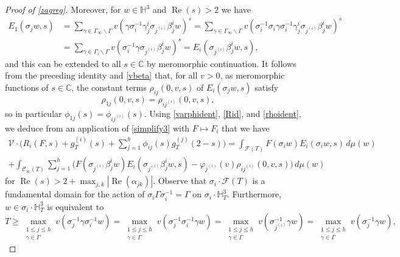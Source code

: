 \documentclass[12pt,reqno]{amsart}
\numberwithin{equation}{section}
\renewcommand{\Re}{\operatorname{Re}}
\begin{document}
\begin{proof}[Proof of \cref{zagreg}]
Moreover, for $w \in \mathbb{H}^3$ and $\Re(s)>2$ we have
\begin{align} \label{eisensteinid}
    E_{1}(\sigma_{j} w,s)& = \sum_{\gamma \in \Gamma_{\infty} \backslash \Gamma } v(\gamma \sigma_i^{-1} \gamma_j^i \sigma_{j^{(i)}} \beta_j^i w )^{s} = \sum_{\gamma \in \Gamma_{\infty} \backslash \Gamma } v(\sigma_{i}^{-1} \sigma_{i} \gamma \sigma_{i}^{-1} \gamma_j^i \sigma_{j^{(i)}} \beta_j^i w )^{s} \nonumber \\
    &=\sum_{\gamma \in \Gamma_{i} \backslash \Gamma } v(\sigma_{i}^{-1} \gamma \sigma_{j^{(i)}} \beta_j^i w )^{s} =E_{i}(\sigma_{j^{(i)}}\beta_j^i w,s),
\end{align}
and this can be extended to all $s \in \mathbb{C}$ by meromorphic continuation.
It follows from the preceding identity and \eqref{vbeta} that, for all $v>0$,
as meromorphic functions of $s \in \mathbb{C}$, the constant terms $\rho_{ij}(0,v,s)$
of $E_i(\sigma_j w,s)$ satisfy
\begin{equation} \label{rhoident}
\rho_{1 j}(0,v,s)= \rho_{i j^{(i)}}(0,v,s),
\end{equation}
so in particular $\phi_{1j}(s) = \phi_{i j^{(i)}}(s)$. Using \eqref{varphident}, \eqref{Rid}, and \eqref{rhoident}, we deduce from an application of \eqref{simplify3} with $F \mapsto F_{i}$ that  we have
\begin{equation} \label{basicstate2}
\begin{aligned}
    \mathcal{V} \cdot \Big(R_{i}(F,s)+ g^{(i)}_{T}(s)+\sum_{j=1}^{h} \phi_{i j}(s) g^{(j)}_{T}(2-s) \Big) = \int_{\mathcal{F}(T)} F(\sigma_i w) E_{i}(\sigma_i w,s) \, d \mu(w)  \\
    +\int_{\mathcal{C}_{\infty}(T)}  \sum_{j=1}^{h}
    \Big(F(\sigma_{j^{(i)}} \beta_j^i w) E_{i}( \sigma_{j^{(i)}} \beta_j^i w, s)- \varphi_{j^{(i)}}(v) \rho_{i j^{(i)}}(0,v,s) \Big) \, d \mu(w)
\end{aligned}
\end{equation}
for $\Re(s)>2 + \max_{j,k} \left|\Re(\alpha_{jk})\right|$.
Observe that $\sigma_i\cdot \mathcal{F}(T)$ is a fundamental domain for the action of $\sigma_i\Gamma\sigma_i^{-1} = \Gamma$ on $\sigma_i \cdot \mathbb{H}^3_T$. Furthermore, $w \in \sigma_i \cdot \mathbb{H}^3_T$ is equivalent to
\begin{equation*}
    T \geq \max_{\substack{1 \leq j \leq h \\ \gamma \in \Gamma}} v(\sigma_{j}^{-1} \gamma \sigma_i^{-1} w ) = \max_{\substack{1 \leq j \leq h \\ \gamma \in \Gamma}} v(\sigma_{j}^{-1}\sigma_i^{-1}  \gamma w ) = \max_{\substack{1 \leq j \leq h \\ \gamma \in \Gamma}} v(\sigma_{j^{(i)}}^{-1}  \gamma w ) = \max_{\substack{1 \leq j \leq h \\ \gamma \in \Gamma}} v(\sigma_{j}^{-1}  \gamma w ),

\end{equation*}
\end{proof}
\end{document}
